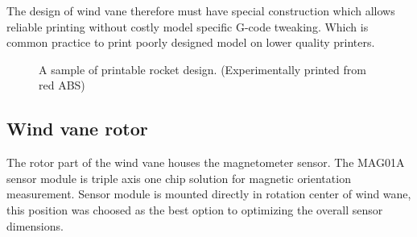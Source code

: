 \documentclass{poster16}
\begin{document}
The design of wind vane therefore must have special construction which allows reliable printing without costly model specific G-code tweaking. Which is common practice to print poorly designed model on lower quality printers. 

\begin{figure}[ht]
\begin{center}
\caption{A sample of printable rocket design. (Experimentally printed from red ABS)} 
\label{fig:printed_parts}
\end{center}
\end{figure}


\subsection{Wind vane rotor}

The rotor part of the wind vane houses the magnetometer sensor. The MAG01A sensor module is triple axis one chip solution for magnetic orientation measurement. Sensor module is mounted directly in rotation center of wind wane, this position was choosed as the best option to optimizing the overall sensor dimensions. 
\end{document}
